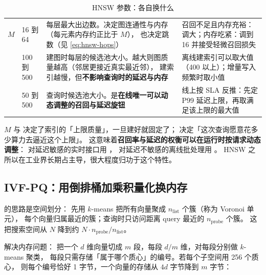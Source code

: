 \begin{table}[htbp]
\centering
\caption{HNSW 参数：各自换什么}
\label{tab:hnsw-params}
\small
\begin{tabularx}{\textwidth}{L{2.2cm} L{1.7cm} L{4.3cm} Y}
\toprule
{} &  &  &  \\
\midrule
$M$ & 16 到 64 &
每层最大出边数。决定图连通性与内存（每元素内存约正比于 $M$），
也决定跳数（见 \cref{eq:hnsw-hops}） &
召回不足且内存充裕：调大；内存吃紧：调到 16 并接受轻微召回损失 \\
\addlinespace
{} & 100 到 500 &
建图时每层的候选池大小。越大则图质量越高（邻居更接近真实最近邻），
建索引越慢，但\textbf{不影响查询时的延迟与内存} &
离线建索引可以取大值（400 以上）；增量写入频繁时取小值 \\
\addlinespace
{} & 50 到 500 &
查询时候选池大小。是\textbf{在线唯一可以动态调整的召回与延迟旋钮} &
线上按 SLA 反推：先定 P99 延迟上限，再取满足该上限的最大值 \\
\bottomrule
\end{tabularx}
\end{table}

\begin{keypoint}
$M$ 与  决定了索引的「上限质量」，一旦建好就固定了；
 决定「这次查询愿意花多少算力去逼近这个上限」。
这意味着\textbf{召回率与延迟的权衡可以在运行时按请求动态调整}：
对延迟敏感的实时接口用 ，
对延迟不敏感的离线批处理用 。
HNSW 之所以在工业界长期占主导，很大程度归功于这个特性。
\end{keypoint}

\subsection{IVF-PQ：用倒排桶加乘积量化换内存}

 的思路是空间划分：
先用 $k$-means 把所有向量聚成 $n_{\text{list}}$ 个簇（称为 Voronoi 单元），
每个向量归属最近的簇；查询时只访问距离 query 最近的 $n_{\text{probe}}$ 个簇。
这把搜索空间从 $N$ 降到约 $N \cdot n_{\text{probe}} / n_{\text{list}}$。

 解决内存问题：
把一个 $d$ 维向量切成 $m$ 段，每段 $d/m$ 维，对每段分别做 $k$-means 聚类，
每段只需存储「属于哪个质心」的编号。若每个子空间用 256 个质心，
则每个编号恰好 1 字节，一个向量的存储从 $4d$ 字节降到 $m$ 字节：

